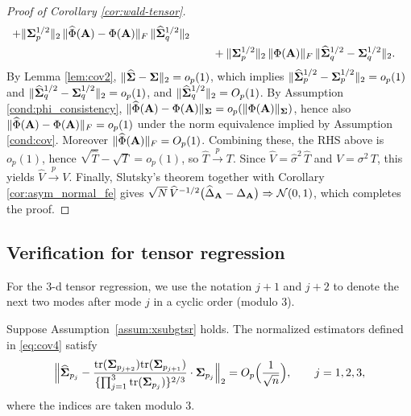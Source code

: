 \documentclass[authoryear,preprint,review,12pt]{elsarticle}
\begin{document}
\begin{proof}[Proof of Corollary \ref{cor:wald-tensor}]
\begin{align*}
		+\|\mathbf{ \Sigma}_p^{1/2}\|_2\,\|\widehat\Phi(\mathbf{A})-\Phi(\mathbf{A})\|_F\,\|\widehat{\mathbf{ \Sigma}}_q^{1/2}\|_2 \\
		&\qquad
		+\|\mathbf{ \Sigma}_p^{1/2}\|_2\,\|\Phi(\mathbf{A})\|_F\,\|\widehat{\mathbf{ \Sigma}}_q^{1/2}-\mathbf{ \Sigma}_q^{1/2}\|_2 .
	\end{align*}
	By Lemma \ref{lem:cov2}, \(\|\widehat{\mathbf{ \Sigma}}-\mathbf{ \Sigma}\|_2=o_p(1)\), which implies
	\(\|\widehat{\mathbf{ \Sigma}}_p^{1/2}-\mathbf{ \Sigma}_p^{1/2}\|_2=o_p(1)\) and
	\(\|\widehat{\mathbf{ \Sigma}}_q^{1/2}-\mathbf{ \Sigma}_q^{1/2}\|_2=o_p(1)\),
	and \(\|\widehat{\mathbf{ \Sigma}}_q^{1/2}\|_2=O_p(1)\).
	By Assumption \ref{cond:phi_consistency}, \(\|\widehat\Phi(\mathbf{A})-\Phi(\mathbf{A})\|_{\mathbf{ \Sigma}}=o_p(\|\Phi(\mathbf{A})\|_{\mathbf{ \Sigma}})\), hence also
	\(\|\widehat\Phi(\mathbf{A})-\Phi(\mathbf{A})\|_F=o_p(1)\) under the norm equivalence implied by Assumption \ref{cond:cov}.
	Moreover \(\|\widehat\Phi(\mathbf{A})\|_F=O_p(1)\).
	Combining these, the RHS above is \(o_p(1)\), hence \(\sqrt{\widehat T}-\sqrt{T}=o_p(1)\),
	so \(\widehat T \stackrel{p}{\rightarrow} T\).
	Since \(\widehat V=\widehat\sigma^2\,\widehat T\) and \(V=\sigma^2\,T\), this yields   \(\widehat V \stackrel{p}{\rightarrow} V\). 
	Finally, Slutsky's theorem together with Corollary \ref{cor:asym_normal_fe} gives
	\(\sqrt{N}\,\widehat V^{-1/2}\bigl(\widehat\Delta_{\mathbf{A}}-\Delta_{\mathbf{A}}\bigr)\Rightarrow \mathcal{N}(0,1)\),
	which completes the proof.
\end{proof}


\subsection{Verification for tensor regression} 
For the 3-d tensor regression, we use the notation  $j+1$ and $j+2$ to denote the next two modes after mode  $j$ in a cyclic order (modulo 3).




\begin{Lemma}\label{lem:cov3}
	Suppose Assumption~\ref{assum:xsubgtsr} holds. The normalized estimators defined in \eqref{eq:cov4} satisfy
	\[
	\Big\| \widehat{\mathbf{ \Sigma}}_{p_j} - \frac{\text{tr}(\mathbf{ \Sigma}_{p_{j+2}}) \text{tr}(\mathbf{ \Sigma}_{p_{j+1}})}{\{\prod_{j=1}^3 \text{tr}(\mathbf{ \Sigma}_{p_j})\}^{2/3}} \cdot \mathbf{ \Sigma}_{p_j}\Big\|_2 = O_p\Big(\frac{1}{\sqrt{n}}\Big),\qquad j=1,2,3,
	\]
	where the indices are taken modulo $3$.
\end{Lemma}
\end{document}
